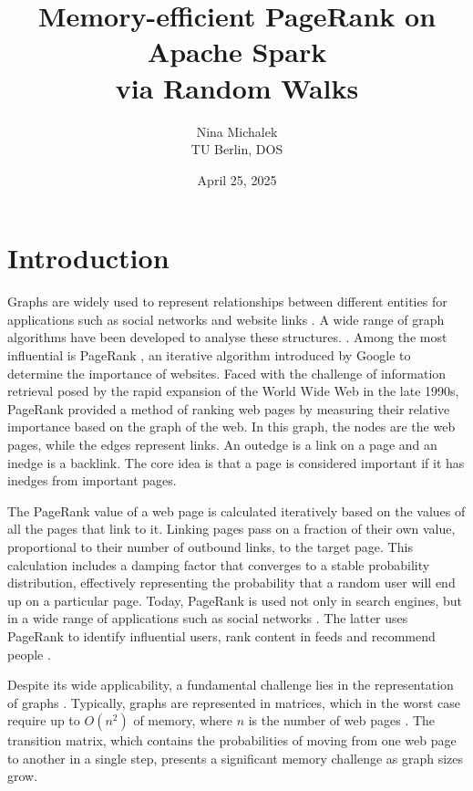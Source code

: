 \documentclass[a4paper,12pt]{article}
\title{Memory-efficient PageRank on Apache Spark\\ via Random Walks}
\author{Nina Michalek\\TU Berlin, DOS}
\date{April 25, 2025}
\begin{document}
\maketitle


\section{Introduction}
 Graphs are widely used to represent relationships between different entities for applications such as social networks and website links \cite{zhang_distributed_2021}. 
A wide range of graph algorithms have been developed to analyse these structures. \cite{malewicz_pregel_2010}\cite{low_distributed_2012}\cite{koch_empirical_2016}. Among the most influential is PageRank \cite{page_pagerank_1999}, an iterative algorithm introduced by Google to determine the importance of websites. Faced with the challenge of information retrieval posed by the rapid expansion of the World Wide Web in the late 1990s, PageRank provided a method of ranking web pages by measuring their relative importance based on the graph of the web. In this graph, the nodes are the web pages, while the edges represent links. An outedge is a link on a page and an inedge is a backlink. The core idea is that a page is considered important if it has inedges from important pages.\par
The PageRank value of a web page is calculated iteratively based on the values of all the pages that link to it. Linking pages pass on a fraction of their own value, proportional to their number of outbound links, to the target page. This calculation includes a damping factor that converges to a stable probability distribution, effectively representing the probability that a random user will end up on a particular page.
Today, PageRank is used not only in search engines, but in a wide range of applications such as social networks \cite{wu_efficient_2024}. The latter uses PageRank to identify influential users, rank content in feeds and recommend people \cite{weng_twitterrank_2010}.\par
Despite its wide applicability, a fundamental challenge lies in the representation of graphs \cite{liu_fast_2015}. Typically, graphs are represented in matrices, which in the worst case require up to $O(n^2)$ of memory, where $n$ is the number of web pages \cite{wu_efficient_2024}. The transition matrix, which contains the probabilities of moving from one web page to another in a single step, presents a significant memory challenge as graph sizes grow.\par
\end{document}
